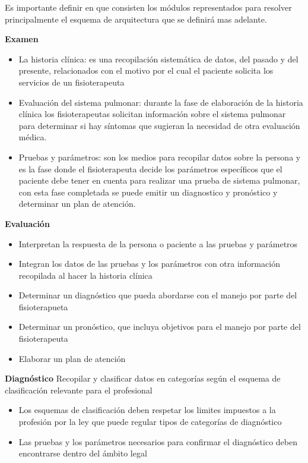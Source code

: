 \documentclass[12pt]{article}
\begin{document}
Es importante definir en que consisten los módulos representados para resolver principalmente el esquema de arquitectura que se definirá mas adelante.

\textbf{Examen}
\begin{itemize}
    \item La historia clínica: es una recopilación sistemática de datos, del pasado y del presente, relacionados con el motivo por el cual el paciente solicita los servicios de un fisioterapeuta
    \item Evaluación del sistema pulmonar: durante la fase de elaboración de la  historia clínica los fisioterapeutas solicitan información sobre el sistema pulmonar para determinar si hay síntomas que sugieran la necesidad de otra evaluación médica.
    \item Pruebas y parámetros: son los medios para recopilar datos sobre la persona y es la fase donde el fisioterapeuta decide los parámetros específicos que el paciente debe tener en cuenta para realizar una prueba de sistema pulmonar, con esta fase completada se puede emitir un diagnostico y pronóstico y determinar un plan de atención.
\end{itemize}

\textbf{Evaluación}
\begin{itemize}
    \item Interpretan la respuesta de la persona o paciente a las pruebas y parámetros
    \item Integran los datos de las pruebas y los parámetros con otra información recopilada al hacer la historia clínica
    \item Determinar un diagnóstico que pueda abordarse con el manejo por parte del fisioterapueta
    \item Determinar un pronóstico, que incluya objetivos para el manejo por parte del fisioterapeuta
    \item Elaborar un plan de atención
\end{itemize}

\textbf{Diagnóstico}
\newline
Recopilar y clasificar datos en categorías según el esquema de clasificación relevante para el profesional
\begin{itemize}
    \item Los esquemas de clasificación deben respetar los limites impuestos a la profesión por la ley que puede regular tipos de categorías de diagnóstico
    \item Las pruebas y los parámetros necesarios para confirmar el diagnóstico deben encontrarse dentro del ámbito legal 
\end{itemize}
\end{document}
